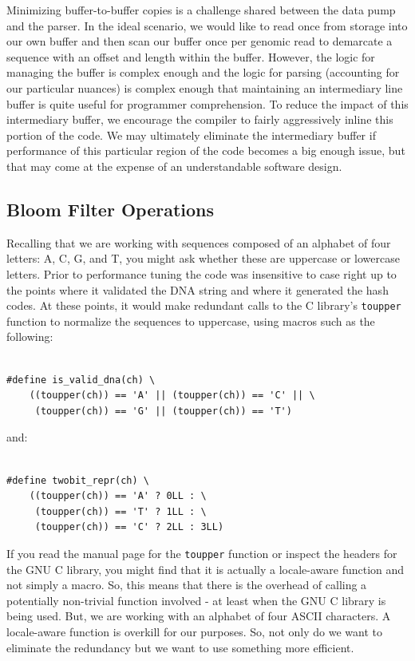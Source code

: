 \documentclass{article}
\begin{document}
Minimizing buffer-to-buffer copies is a challenge shared between the data pump and the parser. In the ideal scenario, we would like to read once from storage into our own buffer and then scan our buffer once per genomic read to demarcate a sequence with an offset and length within the buffer. However, the logic for managing the buffer is complex enough and the logic for parsing (accounting for our particular nuances) is complex enough that maintaining an intermediary line buffer is quite useful for programmer comprehension. To reduce the impact of this intermediary buffer, we encourage the compiler to fairly aggressively inline this portion of the code. We may ultimately eliminate the intermediary buffer if performance of this particular region of the code becomes a big enough issue, but that may come at the expense of an understandable software design.

\subsection{Bloom Filter Operations}

Recalling that we are working with sequences composed of an alphabet of four letters: A, C, G, and T, you might ask whether these are uppercase or lowercase letters. Prior to performance tuning the code was insensitive to case right up to the points where it validated the DNA string and where it generated the hash codes. At these points, it would make redundant calls to the C library's \texttt{toupper} function to normalize the sequences to uppercase, using macros such as the following:

\begin{verbatim}

#define is_valid_dna(ch) \
    ((toupper(ch)) == 'A' || (toupper(ch)) == 'C' || \
     (toupper(ch)) == 'G' || (toupper(ch)) == 'T')

\end{verbatim}

and:

\begin{verbatim}

#define twobit_repr(ch) \
    ((toupper(ch)) == 'A' ? 0LL : \
     (toupper(ch)) == 'T' ? 1LL : \
     (toupper(ch)) == 'C' ? 2LL : 3LL)

\end{verbatim}

If you read the manual page for the \texttt{toupper} function or inspect the headers for the GNU C library, you might find that it is actually a locale-aware function and not simply a macro. So, this means that there is the overhead of calling a potentially non-trivial function involved - at least when the GNU C library is being used. But, we are working with an alphabet of four ASCII characters. A locale-aware function is overkill for our purposes. So, not only do we want to eliminate the redundancy but we want to use something more efficient.
\end{document}
